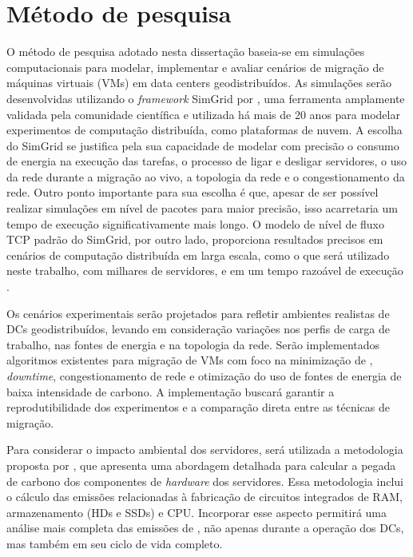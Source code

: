 \documentclass[
	12pt,				%
	oneside,			%
	a4paper,			%
	english,			%
	brazil				%
	]{abntex2ppgsi}
\begin{document}
\section{Método de pesquisa}
O método de pesquisa adotado nesta dissertação baseia-se em simulações computacionais para modelar, implementar e avaliar cenários de migração de máquinas virtuais (VMs) em data centers geodistribuídos. As simulações serão desenvolvidas utilizando o \textit{framework} SimGrid por , uma ferramenta amplamente validada pela comunidade científica e utilizada há mais de 20 anos para modelar experimentos de computação distribuída, como plataformas de nuvem. A escolha do SimGrid se justifica pela sua capacidade de modelar com precisão o consumo de energia na execução das tarefas, o processo de ligar e desligar servidores, o uso da rede durante a migração ao vivo, a topologia da rede e o congestionamento da rede. Outro ponto importante para sua escolha é que, apesar de ser possível realizar simulações em nível de pacotes para maior precisão, isso acarretaria um tempo de execução significativamente mais longo. O modelo de nível de fluxo TCP padrão do SimGrid, por outro lado, proporciona resultados precisos em cenários de computação distribuída em larga escala, como o que será utilizado neste trabalho, com milhares de servidores, e em um tempo razoável de execução \cite{velho:hal-00872476}.

Os cenários experimentais serão projetados para refletir ambientes realistas de DCs geodistribuídos, levando em consideração variações nos perfis de carga de trabalho, nas fontes de energia e na topologia da rede. Serão implementados algoritmos existentes para migração de VMs com foco na minimização de , \textit{downtime}, congestionamento de rede e otimização do uso de fontes de energia de baixa intensidade de carbono. A implementação buscará garantir a reprodutibilidade dos experimentos e a comparação direta entre as técnicas de migração.

Para considerar o impacto ambiental dos servidores, será utilizada a metodologia proposta por , que apresenta uma abordagem detalhada para calcular a pegada de carbono dos componentes de \textit{hardware} dos servidores. Essa metodologia inclui o cálculo das emissões relacionadas à fabricação de circuitos integrados de RAM, armazenamento (HDs e SSDs) e CPU. Incorporar esse aspecto permitirá uma análise mais completa das emissões de , não apenas durante a operação dos DCs, mas também em seu ciclo de vida completo.
\end{document}
